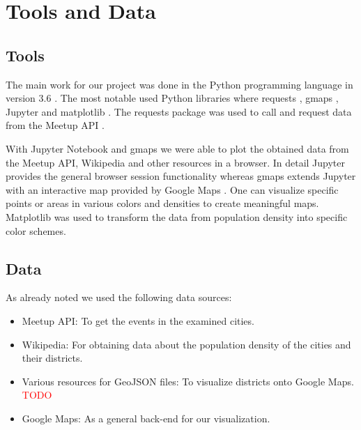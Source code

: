 \section{Tools and Data}\label{sec:toolsanddata}
\subsection{Tools} 
The main work for our project was done in the Python programming language in version 3.6 \cite{python}. The most notable used Python libraries where requests \cite{requests}, gmaps \cite{gmaps}, Jupyter \cite{jupyter} and matplotlib \cite{matplotlib}. The requests package was used to call and request data from the Meetup API \cite{meetupapi}. 

With Jupyter Notebook and gmaps we were able to plot the obtained data from the Meetup API, Wikipedia and other resources in a browser. In detail Jupyter provides the general browser session functionality whereas gmaps extends Jupyter with an interactive map provided by Google Maps \cite{googlemaps}. One can visualize specific points or areas in various colors and densities to create meaningful maps. 
Matplotlib was used to transform the data from population density into specific color schemes. 

\subsection{Data}

As already noted we used the following data sources: 

\begin{itemize}
\item Meetup API: To get the events in the examined cities. 
\item Wikipedia: For obtaining data about the population density of the cities and their districts. 
\item Various resources for GeoJSON files: To visualize districts onto Google Maps. \textcolor{red}{TODO}
\item Google Maps: As a general back-end for our visualization.  

\end{itemize}